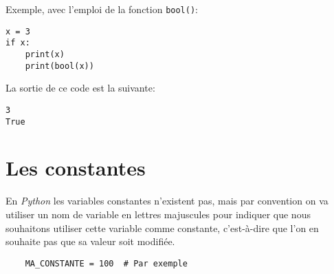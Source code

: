 Exemple, avec l'emploi de la fonction \texttt{bool()}:
\begin{lstlisting}
x = 3
if x:
    print(x)
    print(bool(x))
\end{lstlisting}
\medskip

La sortie de ce code est la suivante:
\begin{verbatim}
3
True
\end{verbatim}
\medskip

\section{Les constantes}
En \textit{Python} les variables constantes n'existent pas, mais par convention on va utiliser un nom de variable en lettres majuscules pour indiquer que nous souhaitons utiliser cette variable comme constante, c'est-à-dire que l'on en souhaite pas que sa valeur soit modifiée.
\begin{verbatim}
    MA_CONSTANTE = 100  # Par exemple
\end{verbatim}
\medskip
